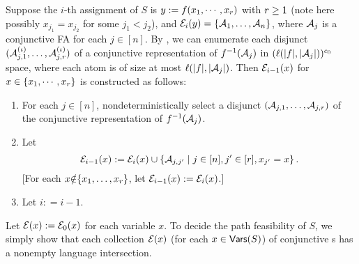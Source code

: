 Suppose the $i$-th assignment of $S$ is $y:= f(x_1,
\cdots, x_r)$ with $r\geq 1$ (note here possibly $x_{j_1} = x_{j_2}$ for some $j_1 < j_2$), and 
$\mathcal{E}_i(y)=\{\mathcal{A}_1, \ldots, \mathcal{A}_n\}$, 
where $\mathcal{A}_j$ is a conjunctive FA for each $j \in [n]$.
By \prerec{}, we can enumerate each disjunct $(\mathcal{A}^{(\iota)}_{j, 1}, \ldots, \mathcal{A}^{(\iota)}_{j, r})$ of a conjunctive representation of 
$f^{-1}(\mathcal{A}_j)$ in $(\ell(|f|,|\mathcal{A}_j|))^{c_0}$ space, where each atom is of size at most $\ell(|f|,|\mathcal{A}_j|)$.
Then $\mathcal{E}_{i-1}(x)$ for $x \in  \{x_1,\cdots, x_r\}$ is constructed as follows: %
\begin{enumerate}
\item For each $j \in [n]$, nondeterministically select a disjunct $\left(\mathcal{A}_{j, 1}, \ldots, \mathcal{A}_{j, r}\right)$ of the conjunctive representation of $f^{-1}(\mathcal{A}_j)$.
%
\item 
Let
\[
    \mathcal{E}_{i-1}(x):= \mathcal{E}_{i}(x) \cup \left\{\mathcal{A}_{j, j'} \mid  j \in [n], j' \in [r], x_{j'} = x
        \right\}.
\]
[For each $x{\notin} \{x_1,\ldots, x_r\}$, let $\mathcal{E}_{i-1}(x) := 
        \mathcal{E}_i(x)$.]
%
\item Let $i: = i-1$.
\end{enumerate}
%
Let $\mathcal{E}(x):=\mathcal{E}_{0}(x)$ for each variable $x$.
To decide the path feasibility of $S$, we simply show that each collection
$\mathcal{E}(x)$ (for each $x \in \mathsf{Vars}(S)$) of conjunctive \FA{}s has a nonempty 
language intersection.


